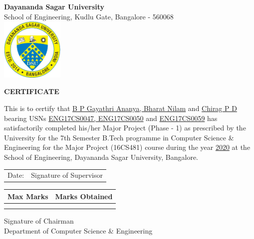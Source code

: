 \documentclass[a4paper,12pt]{article}
\begin{document}
\pagebreak

\begin{center}
    \Large
    \textbf{Dayananda Sagar University \\}
    \large
    School of Engineering, Kudlu Gate, Bangalore - 560068 \\
    \vspace{0.7cm}
    \includegraphics[width=3cm]{dsu logo cropped.jpg}
        
    \vspace{0.7cm}
    \textbf{CERTIFICATE}
    
    \normalsize
    \justify
    This is to certify that \underline{B P Gayathri Ananya, Bharat Nilam} and \underline{Chirag P D} bearing USNs \underline{ENG17CS0047, ENG17CS0050} and \underline{ENG17CS0059} has satisfactorily completed his/her Major Project (Phase - 1) as prescribed by the University for the 7th Semester B.Tech programme in Computer Science \& Engineering for the Major Project (16CS481) course during the year \underline{2020} at the School of Engineering, Dayananda Sagar University, Bangalore.
    
    \vfill
    \centering
    \begin{tabular}{c c}
        Date: & \hspace{2.5in} Signature of Supervisor
    \end{tabular}
    
    \vspace{2cm}
    \begin{tabular}{|m{5cm}|m{5cm}|}
    \hline
         Max Marks & Marks Obtained \\
    \hline & \\
         &  \\
    \hline
    \end{tabular}
    
    \vspace{3cm}
    Signature of Chairman \\
    Department of Computer Science \& Engineering
\end{center}

\pagebreak
\end{document}
